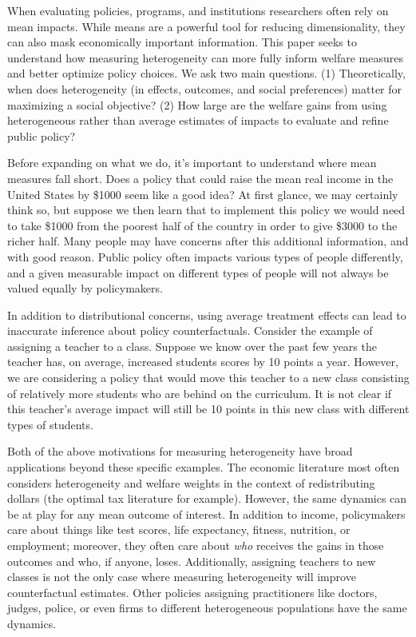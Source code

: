 \documentclass[12pt]{article}
\theoremstyle{definition}
\theoremstyle{definition}
\theoremstyle{definition}
\theoremstyle{definition}
\begin{document}
When evaluating policies, programs, and institutions researchers often rely on mean impacts. While means are a powerful tool for reducing dimensionality, they can also mask economically important information. This paper seeks to understand how measuring heterogeneity can more fully inform welfare measures and better optimize policy choices. We ask two main questions. (1) Theoretically, when does heterogeneity (in effects, outcomes, and social preferences) matter for maximizing a social objective? (2) How large are the welfare gains from using heterogeneous rather than average estimates of impacts to evaluate and refine public policy?

Before expanding on what we do, it's important to understand where mean measures fall short. Does a policy that could raise the mean real income in the United States by \$1000 seem like a good idea? At first glance, we may certainly think so, but suppose we then learn that to implement this policy we would need to take \$1000 from the poorest half of the country in order to give \$3000 to the richer half. Many people may have concerns after this additional information, and with good reason. Public policy often impacts various types of people differently, and a given measurable impact on different types of people will not always be valued equally by policymakers.

In addition to distributional concerns, using average treatment effects can lead to inaccurate inference about policy counterfactuals. Consider the example of assigning a teacher to a class. Suppose we know over the past few years the teacher has, on average, increased students scores by 10 points a year. However, we are considering a policy that would move this teacher to a new class consisting of relatively more students who are behind on the curriculum. It is not clear if this teacher's average impact will still be 10 points in this new class with different types of students.

Both of the above motivations for measuring heterogeneity have broad applications beyond these specific examples. The economic literature most often considers heterogeneity and welfare weights in the context of redistributing dollars (the optimal tax literature for example). However, the same dynamics can be at play for any mean outcome of interest. In addition to income, policymakers care about things like test scores, life expectancy, fitness, nutrition, or employment; moreover, they often care about \textit{who} receives the gains in those outcomes and who, if anyone, loses. Additionally, assigning teachers to new classes is not the only case where measuring heterogeneity will improve counterfactual estimates. Other policies assigning practitioners like doctors, judges, police, or even firms to different heterogeneous populations have the same dynamics.
\end{document}
